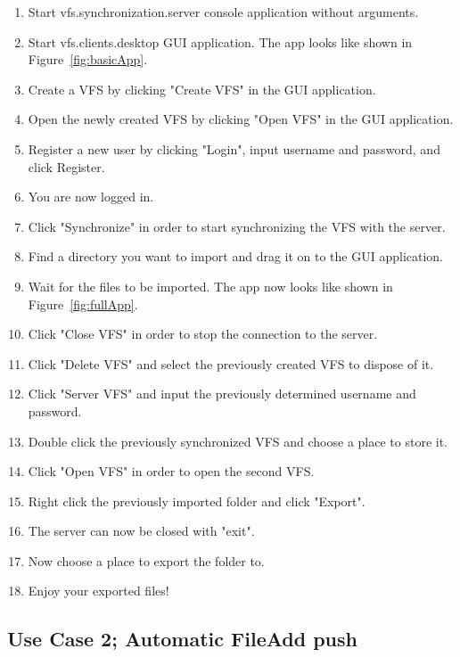 \documentclass[a4paper,12pt]{article}
\begin{document}
\begin{enumerate}
    \item Start vfs.synchronization.server console application without arguments.
    \item Start vfs.clients.desktop GUI application. The app looks like shown in Figure~\ref{fig:basicApp}.
    \item Create a VFS by clicking "Create VFS" in the GUI application.
    \item Open the newly created VFS by clicking "Open VFS" in the GUI application.
    \item Register a new user by clicking "Login", input username and password, and click Register.
    \item You are now logged in.
    \item Click "Synchronize" in order to start synchronizing the VFS with the server.
    \item Find a directory you want to import and drag it on to the GUI application.
    \item Wait for the files to be imported. The app now looks like shown in Figure~\ref{fig:fullApp}.
    \item Click "Close VFS" in order to stop the connection to the server.
    \item Click "Delete VFS" and select the previously created VFS to dispose of it.
    \item Click "Server VFS" and input the previously determined username and password.
    \item Double click the previously synchronized VFS and choose a place to store it.
    \item Click "Open VFS" in order to open the second VFS.
    \item Right click the previously imported folder and click "Export".
		\item The server can now be closed with "exit".
    \item Now choose a place to export the folder to.
    \item Enjoy your exported files!
\end{enumerate}

\subsection{Use Case 2; Automatic FileAdd push}
\end{document}
